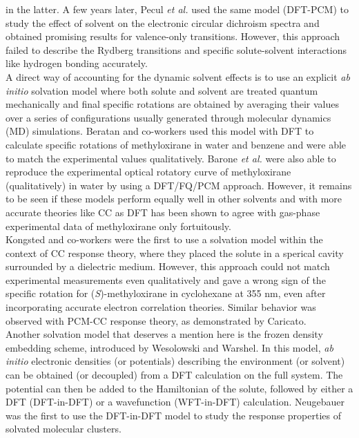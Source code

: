 in the latter. A few years later, Pecul {\em et al.} \cite{Pecul05a} used the same model (DFT-PCM) to study the effect
of solvent on the electronic circular dichroism spectra and obtained promising results for valence-only transitions. 
However, this approach failed to describe the Rydberg transitions and specific solute-solvent interactions like hydrogen bonding accurately.\\
A direct way of accounting for the dynamic solvent effects is to use an explicit {\em ab initio} solvation model where
both solute and solvent are treated quantum mechanically and final specific rotations are obtained by averaging their
values over a series of configurations usually generated through molecular dynamics (MD) simulations. Beratan and co-workers 
used this model with DFT to calculate specific rotations of methyloxirane in water\cite{Mukhopadhyay06} and benzene\cite{Mukhopadhyay07} and were 
able to match the experimental values qualitatively. Barone {\em et al.}\cite{Lipparini13} were also able to reproduce the experimental optical
rotatory curve of methyloxirane (qualitatively) in water by using a DFT/FQ/PCM approach. However, it remains to be seen if these 
models perform equally well in other solvents and with more accurate theories like CC as DFT has been shown to agree 
with gas-phase experimental data of methyloxirane only fortuitously.\\
Kongsted and co-workers were the first to use a solvation model within the context of CC response theory,
where they placed the solute in a sperical cavity surrounded by a dielectric medium. However, this approach 
could not match experimental measurements even qualitatively and gave a wrong sign of the specific rotation for ({\em S})-methyloxirane 
in cyclohexane at 355 nm, even after incorporating accurate electron correlation theories\cite{Kongsted05,Koch97}. Similar behavior was observed 
with PCM-CC response theory, as demonstrated by Caricato\cite{Caricato13}.\\
Another solvation model that deserves a mention here is the frozen density embedding scheme, introduced by Wesolowski and 
Warshel\cite{Wesolowski93}. In this model, {\em ab initio} electronic densities (or potentials) describing the environment (or solvent) 
can be obtained (or decoupled) from a DFT calculation on the full system. The potential can then be added to the Hamiltonian
of the solute, followed by either a DFT (DFT-in-DFT) or a wavefunction (WFT-in-DFT) calculation\cite{Govind99}. Neugebauer
was the first to use the DFT-in-DFT model to study the response properties of solvated molecular clusters\cite{Neugebauer09}. 
